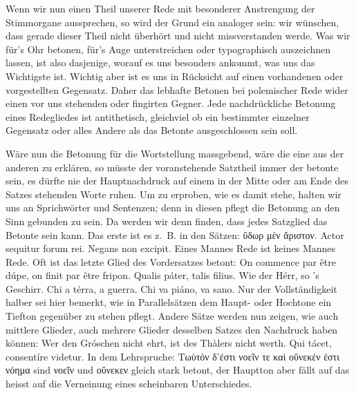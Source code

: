 \begin{sloppypar}Wenn wir nun einen Theil unserer Rede mit besonderer Anstrengung der Stimm\-organe aussprechen, so wird der Grund ein analoger sein: wir wünschen, dass gerade dieser Theil nicht überhört und nicht missverstanden werde. Was wir für’s Ohr betonen, für’s Auge unterstreichen oder typographisch auszeichnen lassen, ist also dasjenige, worauf es uns besonders ankommt, was uns das Wichtigste ist. Wichtig aber ist es uns in Rücksicht auf einen vorhandenen oder vorgestellten Gegensatz. Daher das lebhafte Betonen bei polemischer Rede wider einen vor uns stehenden oder fingirten Gegner. Jede nachdrückliche Betonung eines Redegliedes ist antithetisch, gleichviel ob ein bestimmter einzelner Gegensatz oder alles Andere als das Betonte ausgeschlossen sein soll.\end{sloppypar}

Wäre nun die Betonung für die Wortstellung massgebend, wäre die eine aus der anderen zu erklären, so müsste der voranstehende Satztheil immer der betonte sein, es dürfte nie der Hauptnachdruck auf einem in der Mitte oder am Ende des Satzes stehenden Worte ruhen. Um zu erproben, wie es damit stehe, halten wir uns an Sprichwörter und Sentenzen; denn in diesen pflegt die Betonung an den Sinn gebunden zu sein. Da werden wir denn finden, dass jedes Satzglied das Betonte sein kann. Das erste ist es z.~B. in den Sätzen: ὕδωρ μὲν ἄριστον. Actor sequitur forum rei. Negans non excipit. Eines Mannes Rede ist keines Mannes Rede. Oft ist das letzte Glied des Vordersatzes betont: On commence par être dúpe, on finit par être fripon. Qualis páter, talis filius. Wie der Hérr, so ’s Geschirr. Chi a térra, a guerra. Chi va piáno, va sano. Nur der Vollständigkeit halber sei hier bemerkt, wie in Parallelsätzen dem Haupt- oder Hochtone ein Tiefton gegenüber zu stehen pflegt. Andere Sätze werden \label{sp.375} nun zeigen, wie auch mittlere Glieder, auch mehrere \label{fp.359} Glieder desselben Satzes den Nachdruck haben können: Wer den Gróschen nicht ehrt, ist des Thàlers nicht werth. Qui tácet, consentíre videtur. In dem Lehrspruche: Τωὐτόν δ’ἐστι νοεῖν τε καὶ οὕνεκέν ἐστι νόημα sind νοεῖν und οὕνεκεν gleich stark betont, der Hauptton aber fällt auf  das heisst auf die Verneinung eines scheinbaren Unterschiedes.

